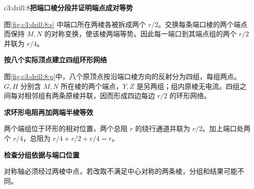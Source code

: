 \begin{drillsolution}{c3:drill:8}\textbf{把端口棱分段并证明端点成对等势}\par\nobreak
图\ref{fig:c3:drill:8:s} 中端口所在两棱各被拆成两个 $r/2$。交换每条端口棱的两个端点而保持 $M,N$ 的对称变换，使该棱两端等势。因此每一端口到其端点组的两个 $r/2$ 并联为 $r/4$。



\par\medskip{}\noindent\textbf{按八个实际顶点建立四组环形网络}\par\nobreak
图\ref{fig:c3:drill:8:p}中，八个原顶点按沿端口棱方向的反射分为四组，每组两点。$G,H$ 分别含 $M,N$ 所在棱的两个端点，$Y,Z$ 是另两组；组内原棱无电流。四组之间每对相邻组有两条原棱并联，因而形成四边每边 $r/2$ 的环形网络。

\par\medskip{}\noindent\textbf{求环形电阻再加两端半棱等效}\par\nobreak
两个端组位于环形的相对位置，两个总阻 $r$ 的绕行通道并联为 $r/2$。加上端口处两个 $r/4$，总阻为 $r/4+r/2+r/4=r$。

\par\medskip{}\noindent\textbf{检查分组依据与端口位置}\par\nobreak
对称轴必须经过两棱中点，若改取不满足中心对称的两条棱，分组和结果可能不同。\end{drillsolution}
